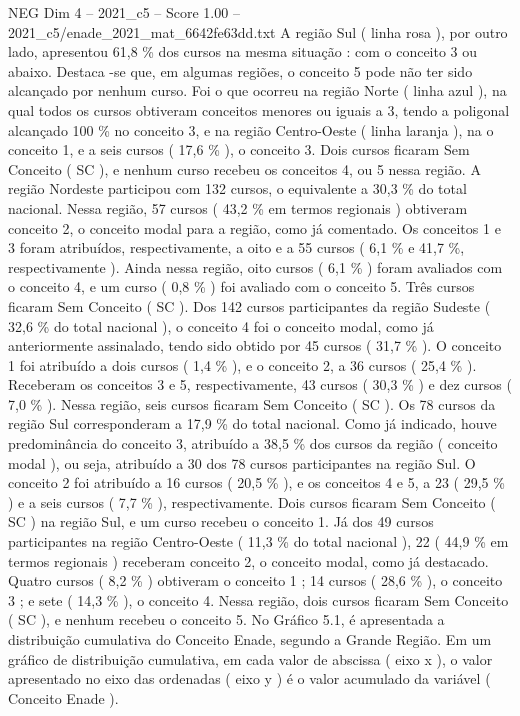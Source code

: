\begin{textsample}{NEG Dim 4 – 2021\_c5 – Score 1.00 – 2021\_c5/enade\_2021\_mat\_6642fe63dd.txt}
A região Sul ( linha rosa ), por outro lado, apresentou 61,8 \% dos cursos na mesma situação : com o conceito 3 ou abaixo.
Destaca -se que, em algumas regiões, o conceito 5 pode não ter sido alcançado por nenhum curso.
Foi o que ocorreu na região Norte ( linha azul ), na qual todos os cursos obtiveram conceitos menores ou iguais a 3, tendo a poligonal alcançado 100 \% no conceito 3, e na região Centro-Oeste ( linha laranja ), na o conceito 1, e a seis cursos ( 17,6 \% ), o conceito 3.
Dois cursos ficaram Sem Conceito ( SC ), e nenhum curso recebeu os conceitos 4, ou 5 nessa região.
A região Nordeste participou com 132 cursos, o equivalente a 30,3 \% do total nacional.
Nessa região, 57 cursos ( 43,2 \% em termos regionais ) obtiveram conceito 2, o conceito modal para a região, como já comentado.
Os conceitos 1 e 3 foram atribuídos, respectivamente, a oito e a 55 cursos ( 6,1 \% e 41,7 \%, respectivamente ).
Ainda nessa região, oito cursos ( 6,1 \% ) foram avaliados com o conceito 4, e um curso ( 0,8 \% ) foi avaliado com o conceito 5.
Três cursos ficaram Sem Conceito ( SC ).
Dos 142 cursos participantes da região Sudeste ( 32,6 \% do total nacional ), o conceito 4 foi o conceito modal, como já anteriormente assinalado, tendo sido obtido por 45 cursos ( 31,7 \% ).
O conceito 1 foi atribuído a dois cursos ( 1,4 \% ), e o conceito 2, a 36 cursos ( 25,4 \% ).
Receberam os conceitos 3 e 5, respectivamente, 43 cursos ( 30,3 \% ) e dez cursos ( 7,0 \% ).
Nessa região, seis cursos ficaram Sem Conceito ( SC ).
Os 78 cursos da região Sul corresponderam a 17,9 \% do total nacional.
Como já indicado, houve predominância do conceito 3, atribuído a 38,5 \% dos cursos da região ( conceito modal ), ou seja, atribuído a 30 dos 78 cursos participantes na região Sul.
O conceito 2 foi atribuído a 16 cursos ( 20,5 \% ), e os conceitos 4 e 5, a 23 ( 29,5 \% ) e a seis cursos ( 7,7 \% ), respectivamente.
Dois cursos ficaram Sem Conceito ( SC ) na região Sul, e um curso recebeu o conceito 1.
Já dos 49 cursos participantes na região Centro-Oeste ( 11,3 \% do total nacional ), 22 ( 44,9 \% em termos regionais ) receberam conceito 2, o conceito modal, como já destacado.
Quatro cursos ( 8,2 \% ) obtiveram o conceito 1 ; 14 cursos ( 28,6 \% ), o conceito 3 ; e sete ( 14,3 \% ), o conceito 4.
Nessa região, dois cursos ficaram Sem Conceito ( SC ), e nenhum recebeu o conceito 5.
No Gráfico 5.1, é apresentada a distribuição cumulativa do Conceito Enade, segundo a Grande Região.
Em um gráfico de distribuição cumulativa, em cada valor de abscissa ( eixo x ), o valor apresentado no eixo das ordenadas ( eixo y ) é o valor acumulado da variável ( Conceito Enade ).

\end{textsample}

